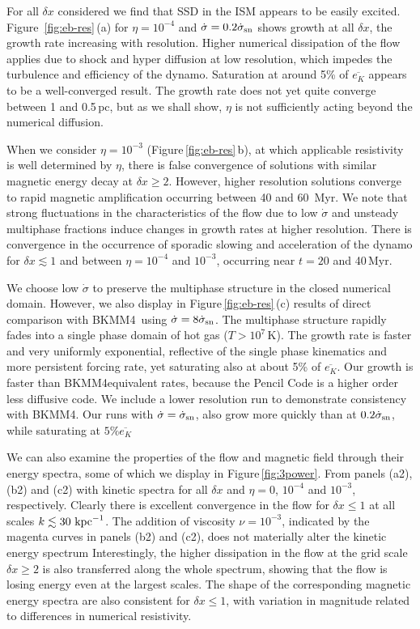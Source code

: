 \documentclass[preprint2]{aastex63}
\newcommand\SNr{\dot\sigma_{\rm sn}}
\newcommand\kpc{~ {\rm kpc}}
\newcommand\dx{ {\delta x}}
\newcommand\BKM{{\sf BKMM4}}
\newcommand{\fg}[1]{\textcolor{midgreen}{#1}}
\begin{document}
\fg{For all $\dx$ considered we find that SSD in the
 ISM appears to be easily excited.
 Figure~\ref{fig:eb-res}\,(a) for $\eta=10^{-4}$ and $\dot\sigma=0.2\SNr$
 shows growth at all $\dx$, the growth rate increasing with resolution.
 Higher numerical dissipation of the flow applies due to shock and hyper
 diffusion at low resolution, which impedes the turbulence and efficiency of
 the dynamo.
 Saturation at around 5\% of $\overline{e_K}$ appears to be a well-converged
 result.
 The growth rate does not yet quite converge between 1 and 0.5\,pc, but as we
 shall show, $\eta$ is not sufficiently acting beyond the numerical diffusion.}

 \fg{When we consider} $\eta=10^{-3}$ \fg{(Figure\,\ref{fig:eb-res}\,b), at which
 applicable resistivity is well determined by $\eta$,} there is false
 convergence
 \citep{FMA91} of solutions with similar magnetic energy decay at $\dx\geq2$.
 However, higher resolution solutions converge to rapid magnetic
 amplification occurring between 40 and 60~Myr.
 \fg{We note that strong fluctuations in the characteristics of the flow due to
 low $\dot\sigma$ and unsteady multiphase fractions induce changes in growth
 rates at higher resolution.
 There is convergence in the occurrence of sporadic slowing and acceleration
 of the dynamo for $\dx\lesssim1$ and between $\eta=10^{-4}$ and $10^{-3}$,
 occurring near $t=20$ and 40\,Myr.
 }
  
 \fg{We choose low $\dot\sigma$ to preserve the multiphase structure in the 
 closed numerical domain. 
 However, we also display in Figure\,\ref{fig:eb-res}\,(c) results of direct
 comparison with \BKM\ using $\dot\sigma=8\SNr$.
 The multiphase structure rapidly fades into a single phase domain of hot gas
 ($T>10^7$\,K).
 The growth rate is faster and very uniformly exponential, reflective of the
 single phase kinematics and more persistent forcing rate, yet saturating
 also at about 5\% of $\overline{e_K}$.
 Our growth is faster than \BKM equivalent rates, because the Pencil Code is a
 higher order less diffusive code.
 We include a lower resolution run to demonstrate consistency with \BKM.
 Our runs with $\dot\sigma=\SNr$, also grow more quickly than at $0.2\SNr$,
 while saturating at $5\%\overline{e_K}$}%

 \fg{We can also examine the properties of the flow and magnetic field through
 their energy spectra, some of which we display in Figure\,\ref{fig:3power}.
 From panels (a2), (b2) and (c2) with kinetic spectra for all $\dx$ and 
 $\eta=0$, $10^{-4}$ and $10^{-3}$, respectively.
 Clearly there is excellent convergence in the flow for $\dx\leq1$ at all
 scales $k\lesssim 30\kpc^{-1}$.
 The addition of viscosity $\nu=10^{-3}$, indicated by the magenta curves in
 panels (b2) and (c2), does not materially alter the kinetic energy spectrum
 Interestingly, the higher dissipation in the flow at the grid scale 
 $\dx\geq2$ is also transferred along the whole spectrum, showing that
 the flow is losing energy even at the largest scales.
 The shape of the corresponding magnetic energy spectra are also consistent 
 for $\dx\leq1$, with variation in magnitude related to differences in
 numerical resistivity.
}
 
\end{document}
